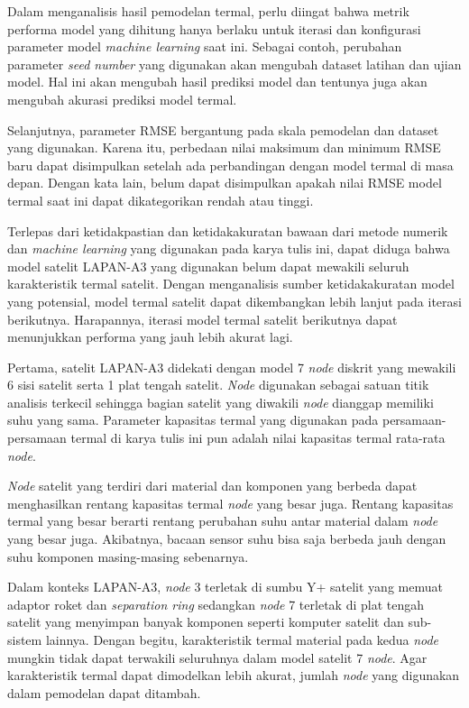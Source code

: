 Dalam menganalisis hasil pemodelan termal, perlu diingat bahwa metrik performa
model yang dihitung hanya berlaku untuk iterasi dan konfigurasi parameter model
\textit{machine learning} saat ini. Sebagai contoh, perubahan parameter
\textit{seed number} yang digunakan akan mengubah dataset latihan dan ujian
model. Hal ini akan mengubah hasil prediksi model dan tentunya juga akan mengubah
akurasi prediksi model termal. 

Selanjutnya, parameter RMSE bergantung pada skala pemodelan dan dataset yang
digunakan. Karena itu, perbedaan nilai maksimum dan minimum RMSE baru dapat
disimpulkan setelah ada perbandingan dengan model termal di masa depan. Dengan
kata lain, belum dapat disimpulkan apakah nilai RMSE model termal saat ini
dapat dikategorikan rendah atau tinggi.

Terlepas dari ketidakpastian dan ketidakakuratan bawaan dari metode numerik dan
\textit{machine learning} yang digunakan pada karya tulis ini, dapat diduga
bahwa model satelit LAPAN-A3 yang digunakan belum dapat mewakili seluruh
karakteristik termal satelit. Dengan menganalisis sumber ketidakakuratan model
yang potensial, model termal satelit dapat dikembangkan lebih lanjut pada
iterasi berikutnya. Harapannya, iterasi model termal satelit berikutnya dapat
menunjukkan performa yang jauh lebih akurat lagi.

Pertama, satelit LAPAN-A3 didekati dengan model 7 \textit{node} diskrit yang
mewakili 6 sisi satelit serta 1 plat tengah satelit. \textit{Node} digunakan sebagai
satuan titik analisis terkecil sehingga bagian satelit yang diwakili \textit{node}
dianggap memiliki suhu yang sama. Parameter kapasitas termal yang digunakan
pada persamaan-persamaan termal di karya tulis ini pun adalah nilai kapasitas
termal rata-rata \textit{node}. 

\textit{Node} satelit yang terdiri dari material dan komponen yang berbeda dapat
menghasilkan rentang kapasitas termal \textit{node} yang besar juga. Rentang kapasitas
termal yang besar berarti rentang perubahan suhu antar material dalam \textit{node} yang
besar juga. Akibatnya, bacaan sensor suhu bisa saja berbeda jauh dengan suhu
komponen masing-masing sebenarnya.

Dalam konteks LAPAN-A3, \textit{node} 3 terletak di sumbu Y+ satelit yang memuat adaptor
roket dan \textit{separation ring} sedangkan \textit{node} 7 terletak di plat tengah
satelit yang menyimpan banyak komponen seperti komputer satelit dan sub-sistem
lainnya. Dengan begitu, karakteristik termal material pada kedua \textit{node} mungkin
tidak dapat terwakili seluruhnya dalam model satelit 7 \textit{node}. Agar karakteristik
termal dapat dimodelkan lebih akurat, jumlah \textit{node} yang digunakan dalam
pemodelan dapat ditambah.

